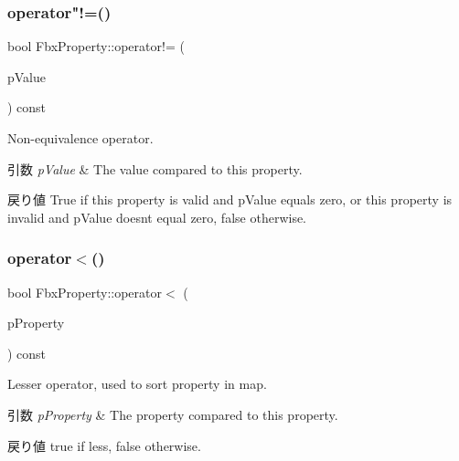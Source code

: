\subsubsection{\texorpdfstring{operator"!=()}{operator!=()}\hspace{0.1cm}{\footnotesize\ttfamily [2/2]}}
{\footnotesize\ttfamily bool Fbx\+Property\+::operator!= (\begin{DoxyParamCaption}\item[{int}]{p\+Value }\end{DoxyParamCaption}) const}

Non-\/equivalence operator. 
\begin{DoxyParams}{引数}
{\em p\+Value} & The value compared to this property. \\
\hline
\end{DoxyParams}
\begin{DoxyReturn}{戻り値}
{\ttfamily True} if this property is valid and p\+Value equals zero, or this property is invalid and p\+Value doesn\textquotesingle{}t equal zero, {\ttfamily false} otherwise. 
\end{DoxyReturn}
\mbox{\label{class_fbx_property_aa02dd8d143c2814367c1a81de6ab42a2}} 
\subsubsection{\texorpdfstring{operator$<$()}{operator<()}}
{\footnotesize\ttfamily bool Fbx\+Property\+::operator$<$ (\begin{DoxyParamCaption}\item[{const \hyperlink{class_fbx_property}{Fbx\+Property} \&}]{p\+Property }\end{DoxyParamCaption}) const}

Lesser operator, used to sort property in map. 
\begin{DoxyParams}{引数}
{\em p\+Property} & The property compared to this property. \\
\hline
\end{DoxyParams}
\begin{DoxyReturn}{戻り値}
{\ttfamily true} if less, {\ttfamily false} otherwise. 
\end{DoxyReturn}
\mbox{\label{class_fbx_property_a14126bd5d02fd8558c5946cc7ba12d46}} 
